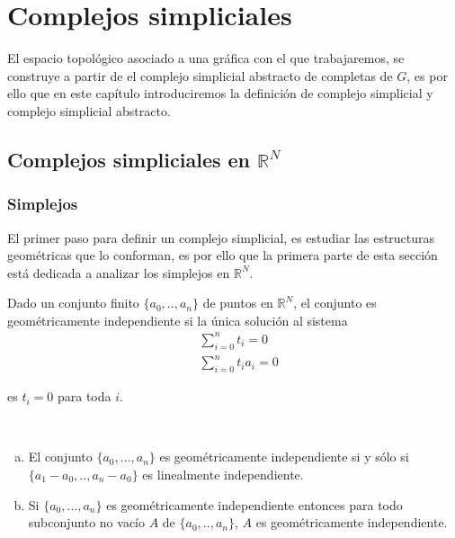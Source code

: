 \chapter{Complejos simpliciales}
El espacio topológico asociado a una gráfica con el que trabajaremos, se construye a partir de el complejo simplicial abstracto de completas de $G$, es por ello que en este capítulo introduciremos la definición de complejo simplicial y complejo simplicial abstracto.
\section{Complejos simpliciales en $\mathbb{R}^N$}
\subsection{Simplejos}  
El primer paso para definir un complejo simplicial, es estudiar las estructuras geométricas que lo conforman, es por ello que la primera parte de esta sección está dedicada a analizar los simplejos en $\mathbb{R}^N$.           
\begin{Defi}
Dado un conjunto finito $\{a_0,..,a_n\}$ de puntos en $\mathbb{R}^{N}$, el conjunto es geométricamente independiente si la única solución al sistema 
\begin{equation}\label{s1}
    \begin{split}
     &\sum_{i=0}^{n}t_{i} = 0 \\
     &\sum_{i=0}^{n}t_{i}a_{i} = 0   
    \end{split}
\end{equation}

es $t_i = 0$ para toda $i$.
\end{Defi}

\begin{Teo}
~\begin{enumerate}[(a)]
    \item El conjunto $\{a_0,...,a_n\}$ es geométricamente independiente si y sólo si $\{a_1-a_0,..,a_n-a_0\}$ es linealmente independiente.
    \item Si $\{a_0,...,a_n\}$ es geométricamente independiente entonces para todo subconjunto no vacío $A$ de $\{a_0,..,a_n\}$, $A$ es geométricamente independiente.
\end{enumerate}
\end{Teo}


